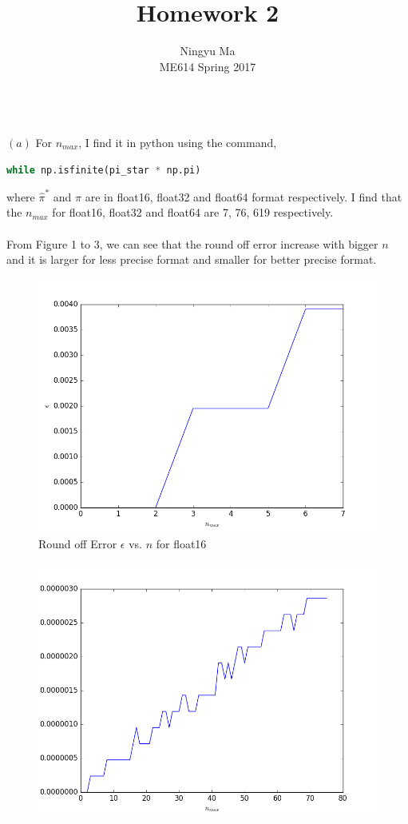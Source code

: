 \documentclass[12pt]{article}
\newenvironment{problem}[2][Problem]{\begin{trivlist}
\item[\hskip \labelsep {\bfseries #1}\hskip \labelsep {\bfseries #2.}]}{\end{trivlist}}
\begin{document}
 
\title{Homework 2}
\author{Ningyu Ma\\ 
ME614 Spring 2017}

\maketitle
\begin{problem}{1}
\text{}\\
$(a)$ For $n_{max}$, I find it in python using the command,
\begin{lstlisting}[language=Python]
while np.isfinite(pi_star * np.pi)
\end{lstlisting}
where $\hat{\pi}^{*}$ and $\pi$ are in float16, float32 and float64 format respectively.
I find that the $n_{max}$ for float16, float32 and float64 are 7, 76, 619 respectively.\\
\\
From Figure 1 to 3, we can see that the round off error increase with bigger $n$ and it is larger for less precise format and smaller for better precise format.\\
\begin{figure}[H]
\centering
  \includegraphics[scale=0.65]{p1_f16.png}
 \caption{Round off Error $\epsilon$ vs. $n$ for float16}
\label{label}
\end{figure}
\begin{figure}[H]
\centering
  \includegraphics[scale=0.65]{p1_f32.png}

\end{figure}
\end{problem}
\end{document}
